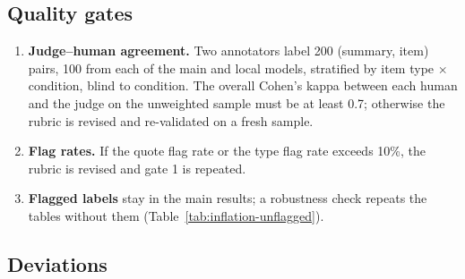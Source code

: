 \subsection{Quality gates}
\begin{enumerate}
  \item \textbf{Judge--human agreement.} Two annotators label 200 (summary, item) pairs, 100
        from each of the main and local models, stratified by item type $\times$ condition,
        blind to condition. The overall Cohen's kappa between each human and the judge on the
        unweighted sample must be at least 0.7; otherwise the rubric is revised and
        re-validated on a fresh sample.
  \item \textbf{Flag rates.} If the quote flag rate or the type flag rate exceeds 10\%, the
        rubric is revised and gate 1 is repeated.
  \item \textbf{Flagged labels} stay in the main results; a robustness check repeats the tables
        without them (Table~\ref{tab:inflation-unflagged}).
\end{enumerate}


\subsection{Deviations}

